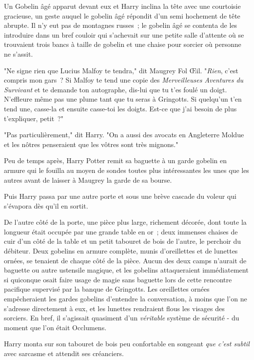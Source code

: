 Un Gobelin âgé apparut devant eux et Harry inclina la tête avec une courtoisie gracieuse, un geste auquel le gobelin âgé répondit d'un semi hochement de tête abrupte. Il n'y eut pas de montagnes russes~; le gobelin âgé se contenta de les introduire dans un bref couloir qui s'achevait sur une petite salle d'attente où se trouvaient trois bancs à taille de gobelin et une chaise pour sorcier où personne ne s'assit.

"Ne signe rien que Lucius Malfoy te tendra," dit Maugrey Fol Œil. "\emph{Rien}, c'est compris mon gars~? Si Malfoy te tend une copie des \emph{Merveilleuses Aventures du Survivant} et te demande ton autographe, dis-lui que tu t'es foulé un doigt. N'effleure même pas une plume tant que tu seras à Gringotts. Si quelqu'un t'en tend une, casse-la et ensuite casse-toi les doigts. Est-ce que j'ai besoin de plus t'expliquer, petit~?"

"Pas particulièrement," dit Harry. "On a aussi des avocats en Angleterre Moldue et les nôtres penseraient que les vôtres sont très mignons."

Peu de temps après, Harry Potter remit sa baguette à un garde gobelin en armure qui le fouilla au moyen de sondes toutes plus intéressantes les unes que les autres avant de laisser à Maugrey la garde de sa bourse.

Puis Harry passa par une autre porte et sous une brève cascade du voleur qui s'évapora dès qu'il en sortit.

De l'autre côté de la porte, une pièce plus large, richement décorée, dont toute la longueur était occupée par une grande table en or~; deux immenses chaises de cuir d'un côté de la table et un petit tabouret de bois de l'autre, le perchoir du débiteur. Deux gobelins en armure complète, munis d'oreillettes et de lunettes ornées, se tenaient de chaque côté de la pièce. Aucun des deux camps n'aurait de baguette ou autre ustensile magique, et les gobelins attaqueraient immédiatement si quiconque osait faire usage de magie sans baguette lors de cette rencontre pacifique supervisé par la banque de Gringotts. Les oreillettes ornées empêcheraient les gardes gobelins d'entendre la conversation, à moins que l'on ne s'adresse directement à eux, et les lunettes rendraient flous les visages des sorciers. En bref, il s'agissait quasiment d'un \emph{véritable} système de sécurité - du moment que l'on était Occlumens.

Harry monta sur son tabouret de bois peu confortable en songeant \emph{que c'est subtil} avec sarcasme et attendit ses créanciers.

